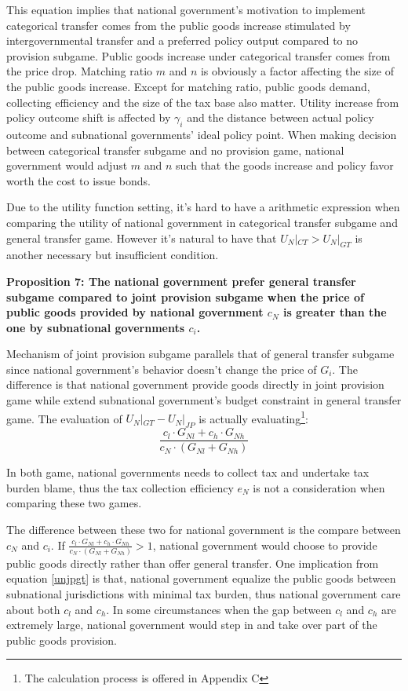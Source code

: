 \begin{itemize}
This equation implies that national government's motivation to implement categorical transfer comes from the public goods increase stimulated by intergovernmental transfer and a preferred policy output compared to no provision subgame. Public goods increase under categorical transfer comes from the price drop. Matching ratio $m$ and $n$ is obviously a factor affecting the size of the public goods increase. Except for matching ratio, public goods demand, collecting efficiency and the size of the tax base also matter. Utility increase from policy outcome shift is affected by $\gamma_i$ and the distance between actual policy outcome and subnational governments' ideal policy point.
When making decision between categorical transfer subgame and no provision game, national government would adjust $m$ and $n$ such that the goods increase and policy favor worth the cost to issue bonds.

Due to the utility function setting, it's hard to have a arithmetic expression when comparing the utility of national government in categorical transfer subgame and general transfer game. However it's natural to have that $U_N|_{CT}>U_N|_{GT}$ is another  necessary but insufficient condition.


\textbf{Proposition 7: The national government prefer general transfer subgame compared to joint provision subgame when the price of public goods provided by national government $c_N$ is greater than the one by subnational governments $c_i$.}

Mechanism of joint provision subgame parallels that of general transfer subgame since national government's behavior doesn't change the price of $G_i$. The difference is that national government provide goods directly in joint provision game while extend subnational government's budget constraint in general transfer game. The evaluation of $U_N|_{GT}-U_N|_{JP}$ is actually evaluating\footnote{The calculation process is offered in Appendix C}:
\begin{equation}
    \frac{c_l\cdot G_{Nl}+c_h\cdot G_{Nh}}{c_N\cdot (G_{Nl}+G_{Nh})}
\end{equation}\label{unjpgt}

In both game, national governments needs to collect tax and undertake tax burden blame, thus the tax collection efficiency $e_N$ is not a consideration when comparing these two games.

The difference between these two for national government is the compare between $c_N$ and $c_i$. If $\frac{c_l\cdot G_{Nl}+c_h\cdot G_{Nh}}{c_N\cdot (G_{Nl}+G_{Nh})}>1$, national government would choose to provide public goods directly rather than offer general transfer. One implication from equation \ref{unjpgt} is that, national government equalize the public goods between subnational jurisdictions with minimal tax burden, thus national government care about both $c_l$ and $c_h$. In some circumstances when the gap between $c_l$ and $c_h$ are extremely large, national government would step in and take over part of the public goods provision.


\end{itemize}
